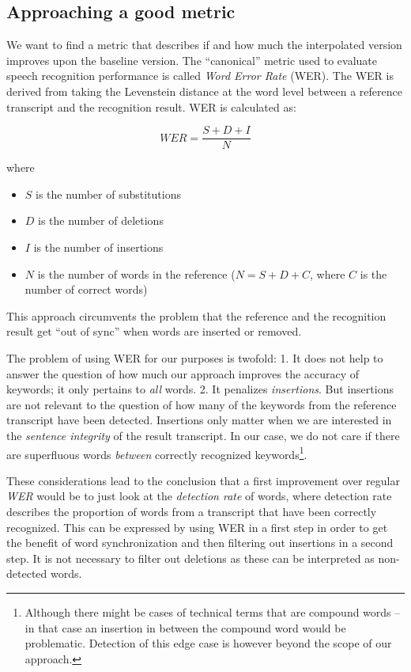 \documentclass[]{article}
\providecommand{\tightlist}{%
  \setlength{\itemsep}{0pt}\setlength{\parskip}{0pt}}
\begin{document}
\subsection{Approaching a good metric}\label{approaching-a-good-metric}

We want to find a metric that describes if and how much the interpolated
version improves upon the baseline version. The ``canonical'' metric
used to evaluate speech recognition performance is called \emph{Word
Error Rate} (WER). The WER is derived from taking the Levenstein
distance at the word level between a reference transcript and the
recognition result. WER is calculated as:

\[ WER = \frac{S + D + I}{N} \]

where

\begin{itemize}
\tightlist
\item
  \(S\) is the number of substitutions
\item
  \(D\) is the number of deletions
\item
  \(I\) is the number of insertions
\item
  \(N\) is the number of words in the reference (\(N = S+D+C\), where
  \(C\) is the number of correct words)
\end{itemize}

This approach circumvents the problem that the reference and the
recognition result get ``out of sync'' when words are inserted or
removed.

The problem of using WER for our purposes is twofold: 1. It does not
help to answer the question of how much our approach improves the
accuracy of keywords; it only pertains to \emph{all} words. 2. It
penalizes \emph{insertions}. But insertions are not relevant to the
question of how many of the keywords from the reference transcript have
been detected. Insertions only matter when we are interested in the
\emph{sentence integrity} of the result transcript. In our case, we do
not care if there are superfluous words \emph{between} correctly
recognized keywords\footnote{Although there might be cases of technical
  terms that are compound words -- in that case an insertion in between
  the compound word would be problematic. Detection of this edge case is
  however beyond the scope of our approach.}.

These considerations lead to the conclusion that a first improvement
over regular \emph{WER} would be to just look at the \emph{detection
rate} of words, where detection rate describes the proportion of words
from a transcript that have been correctly recognized. This can be
expressed by using WER in a first step in order to get the benefit of
word synchronization and then filtering out insertions in a second step.
It is not necessary to filter out deletions as these can be interpreted
as non-detected words.
\end{document}
